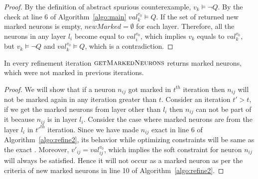 \begin{proof}
By the definition of abstract spurious counterexample, ${v_k} \models \lnot Q$. 
By the check at line 6 of Algorithm~\ref{algo:main} ${val_k^{{v_0}}} \models Q$. 
If the set of returned new marked neurons is empty, $newMarked = \emptyset$ for each layer. 
Therefore, all the neurons in any layer $l_i$ become equal to ${val_i^{{v_0}}}$,  
which implies ${v_k}$ equals to ${val_k^{{v_0}}}$, but ${v_k} \models \lnot Q$ and 
${val_k^{{v_0}}} \models Q$, which is a contradiction.   
\end{proof}


\begin{theorem}
  \label{th:progress2}
  In every refinement iteration $\textsc{getMarkedNeurons}$
  returns marked neurons, which were not marked in previous iterations. 
\end{theorem}

\begin{proof}
We will show that if a neuron $n_{ij}$ got marked in $t^{th}$ iteration then $n_{ij}$ will not be marked again in any iteration greater than $t$.
Consider an iteration $t' > t$, if we get the marked neurons from layer other
than $l_i$ then $n_{ij}$ can not be part of it because $n_{ij}$ is in layer $l_i$. 
Consider the case where marked neurons are from the layer $l_i$ in $t'^{th}$ iteration. 
Since we have made $n_{ij}$ exact in line 6 of Algorithm~\ref{algo:refine2},
its behavior while optimizing constraints will be same as the exact \relu{}. 
Moreover, $v'_{ij} = val_{ij}^{v_0}$, 
which implies the soft constraint for neuron $n_{ij}$ will always be satisfied. Hence it will not occur as a marked neuron as per the criteria of new marked neurons in line 10 of Algorithm~\ref{algo:refine2}.   %
\end{proof}


